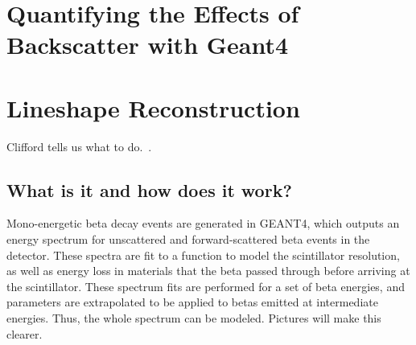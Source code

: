 
%
\section{Quantifying the Effects of Backscatter with Geant4}

\section{Lineshape Reconstruction}
\label{sec:lineshape_results}
	Clifford tells us what to do.~\cite{clifford}.
	
	\subsection{What is it and how does it work?}
	Mono-energetic beta decay events are generated in GEANT4, which outputs an energy spectrum for unscattered and forward-scattered beta events in the detector.  These spectra are fit to a function to model the scintillator resolution, as well as energy loss in materials that the beta passed through before arriving at the scintillator.  These spectrum fits are performed for a set of beta energies, and parameters are extrapolated to be applied to betas emitted at intermediate energies.  Thus, the whole spectrum can be modeled.  Pictures will make this clearer. 
	
